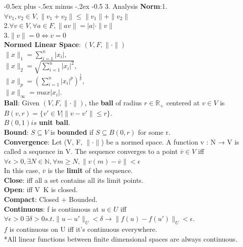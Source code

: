 \documentclass[10pt,landscape]{article}
\makeatletter
\renewcommand{\section}{\@startsection{section}{1}{0mm}%
                                {-0.5ex plus -.5ex minus -.2ex}%
                                {-0.5\baselineskip}%
                                {\normalfont\small\bfseries}}
\makeatother
\begin{document}
\begin{multicols*}{4}
\section{3. Analysis}
\textbf{Norm}:1.$\forall v_1,v_2 \in V, \parallel v_1+v_2 \parallel \leq \parallel v_1 \parallel + \parallel v_2 \parallel$\\
2.$\forall v \in V, \forall a \in F, \parallel av \parallel =|a| \cdot \parallel v \parallel$\\
3.$\parallel v \parallel = 0 \Leftrightarrow v=0$\\
\textbf{Normed Linear Space}: $(V,F,\parallel \cdot \parallel)$\\
$\parallel x \parallel_1 = \sum_{i=1}^{n} |x_i|,$\\
$\parallel x \parallel_2 = \sqrt{\sum_{i=1}^{n} |x_i|^2},$\\
$\parallel x \parallel_p = (\sum_{i=1}^{n} |x_i|^p)^{\frac{1}{p}},$\\
$\parallel x \parallel_\infty = max |x_i|.$\\

\textbf{Ball}: Given $(V,F,\parallel \cdot \parallel)$, the \textbf{ball} of radius $r \in \mathbb{R}_+$ centered at $v \in V$ is $B(v,r) = \{ v' \in V | \parallel v - v' \parallel \leq r\}$.\\
$B(0,1) is$ \textbf{unit ball}.\\
\textbf{Bound}: $S \subseteq V$ is \textbf{bounded} if $S \subseteq B(0,r)$ for some r.\\
\textbf{Convergence}: Let (V, F, $\parallel \cdot \parallel$) be a normed space. A function v : N → V is called a sequence in V. The sequence converges to a point $\overline{v} \in V$ iff $\forall \epsilon > 0, \exists N \in \mathbb{N}, \forall m \geq N, \parallel v(m)-\overline{v} \parallel < \epsilon$\\

In this case, $\overline{v}$ is the \textbf{limit} of the sequence.\\
\textbf{Close}: iff all a set contains all its limit points.\\
\textbf{Open}: iff V\ K is closed.\\

\textbf{Compact}: Closed + Bounded.\\

\textbf{Continuous}: f is continuous at $u \in U$ iff
$\forall \epsilon > 0\ \exists \delta >0 s.t. \parallel u-u' \parallel_U < \delta \rightarrow \parallel f(u)-f(u') \parallel_U < \epsilon $.\\
$f$ is continuous on U iff it's continuous everywhere.\\
*All linear functions between finite dimensional spaces are always continuous.\\


\end{multicols*}
\end{document}
